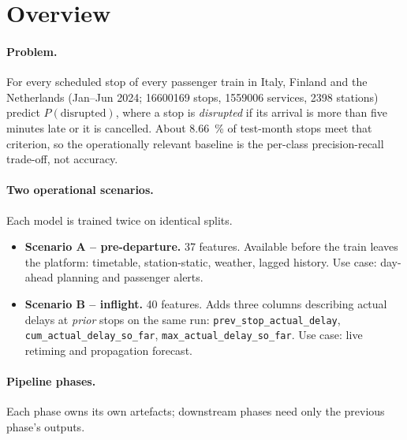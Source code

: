 \section{Overview}
\label{sec:overview}

\paragraph{Problem.} For every scheduled stop of every passenger train in Italy, Finland and the Netherlands (Jan--Jun 2024; \num{16600169} stops, \num{1559006} services, \num{2398} stations) predict $P(\text{disrupted})$, where a stop is \emph{disrupted} if its arrival is more than five minutes late or it is cancelled. About \SI{8.66}{\percent} of test-month stops meet that criterion, so the operationally relevant baseline is the per-class precision-recall trade-off, not accuracy.

\paragraph{Two operational scenarios.} Each model is trained twice on identical splits.
\begin{itemize}
    \item \textbf{Scenario A -- pre-departure.} 37 features. Available before the train leaves the platform: timetable, station-static, weather, lagged history. Use case: day-ahead planning and passenger alerts.
    \item \textbf{Scenario B -- inflight.} 40 features. Adds three columns describing actual delays at \emph{prior} stops on the same run: \texttt{prev\_stop\_actual\_delay}, \texttt{cum\_actual\_delay\_so\_far}, \texttt{max\_actual\_delay\_so\_far}. Use case: live retiming and propagation forecast.
\end{itemize}

\paragraph{Pipeline phases.} Each phase owns its own artefacts; downstream phases need only the previous phase's outputs.

